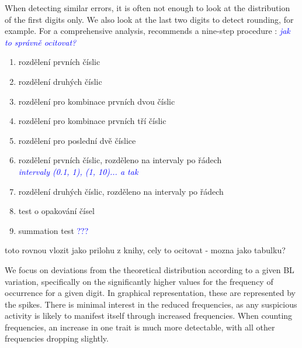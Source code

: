When detecting similar errors, it is often not enough to look at the distribution of the first digits only. We also look at the last two digits to detect rounding, for example. For a comprehensive analysis, \citeauthor{kossovsky2014benford} recommends a nine-step procedure
\cite{kossovsky2014benford}: %
\textcolor{blue}{\emph{jak to správně ocitovat?}} 

\begin{enumerate}
    \item rozdělení prvních číslic
    \item rozdělení druhých číslic 
    \item rozdělení pro kombinace prvních dvou číslic 
    \item rozdělení pro kombinace prvních tří číslic
    \item rozdělení pro poslední dvě číslice 
    \item rozdělení prvních číslic, rozděleno na intervaly po řádech \\ \textcolor{blue}{\emph{intervaly (0.1, 1), (1, 10)... a tak}}
    \item rozdělení druhých číslic, rozděleno na intervaly po řádech 
    \item test o opakování čísel 
    \item summation test \textcolor{blue}{???}    
\end{enumerate}

\begin{koment}
    toto rovnou vlozit jako prilohu z knihy, cely to ocitovat - mozna jako tabulku? 
\end{koment}


We focus on deviations from the theoretical distribution according to a given BL variation, specifically on the significantly higher values for the frequency of occurrence for a given digit. In graphical representation, these are represented by the spikes. There is minimal interest in the reduced frequencies, as any suspicious activity is likely to manifest itself through increased frequencies. When counting frequencies, an increase in one trait is much more detectable, with all other frequencies dropping slightly.\cite{kossovsky2014benford} %


